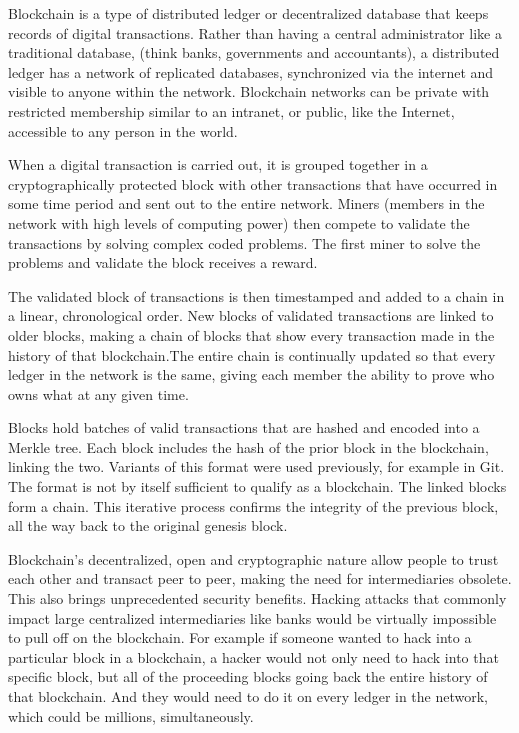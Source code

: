Blockchain is a type of distributed ledger or decentralized database that keeps records of digital transactions. Rather than having a central administrator like a traditional database, (think banks, governments and accountants), a distributed ledger has a network of replicated databases, synchronized via the internet and visible to anyone within the network. Blockchain networks can be private with restricted membership similar to an intranet, or public, like the Internet, accessible to any person in the world.

When a digital transaction is carried out, it is grouped together in a cryptographically protected block with other transactions that have occurred in some time period and sent out to the entire network. Miners (members in the network with high levels of computing power) then compete to validate the transactions by solving complex coded problems. The first miner to solve the problems and validate the block receives a reward.

The validated block of transactions is then timestamped and added to a chain in a linear, chronological order. New blocks of validated transactions are linked to older blocks, making a chain of blocks that show every transaction made in the history of that blockchain.The entire chain is continually updated so that every ledger in the network is the same, giving each member the ability to prove who owns what at any given time.

Blocks hold batches of valid transactions that are hashed and encoded into a Merkle tree. Each block includes the hash of the prior block in the blockchain, linking the two. Variants of this format were used previously, for example in Git. The format is not by itself sufficient to qualify as a blockchain. The linked blocks form a chain. This iterative process confirms the integrity of the previous block, all the way back to the original genesis block.

Blockchain’s decentralized, open and cryptographic nature allow people to trust each other and transact peer to peer, making the need for intermediaries obsolete. This also brings unprecedented security benefits. Hacking attacks that commonly impact large centralized intermediaries like banks would be virtually impossible to pull off on the blockchain. For example if someone wanted to hack into a particular block in a blockchain, a hacker would not only need to hack into that specific block, but all of the proceeding blocks going back the entire history of that blockchain. And they would need to do it on every ledger in the network, which could be millions, simultaneously.


